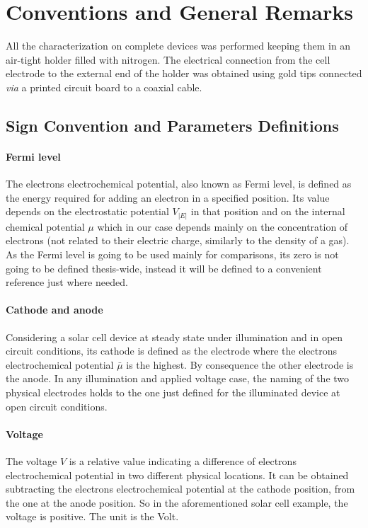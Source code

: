 

\section{Conventions and General Remarks}

	All the characterization on complete devices was performed keeping them in an air-tight holder filled with nitrogen.
	The electrical connection from the cell electrode to the external end of the holder was obtained using gold tips connected \textsl{via} a printed circuit board to a coaxial cable.

	\subsection{Sign Convention and Parameters Definitions}

		\paragraph{Fermi level}
		The electrons electrochemical potential, also known as Fermi level, is defined as the energy required for adding an electron in a specified position.
		Its value depends on the electrostatic potential $V_|E|$ in that position and on the internal chemical potential $\mu$ which in our case depends mainly on the concentration of electrons (not related to their electric charge, similarly to the density of a gas).
		As the Fermi level is going to be used mainly for comparisons, its zero is not going to be defined thesis-wide, instead it will be defined to a convenient reference just where needed.

		\paragraph{Cathode and anode}
		Considering a solar cell device at steady state under illumination and in open circuit conditions, its cathode is defined as the electrode where the electrons electrochemical potential $\bar\mu$ is the highest.
		By consequence the other electrode is the anode.
		In any illumination and applied voltage case, the naming of the two physical electrodes holds to the one just defined for the illuminated device at open circuit conditions.

		\paragraph{Voltage}
		The voltage $V$ is a relative value indicating a difference of electrons electrochemical potential in two different physical locations.
		It can be obtained subtracting the electrons electrochemical potential at the cathode position, from the one at the anode position.
		So in the aforementioned solar cell example, the voltage is positive.
		The unit is the Volt.

